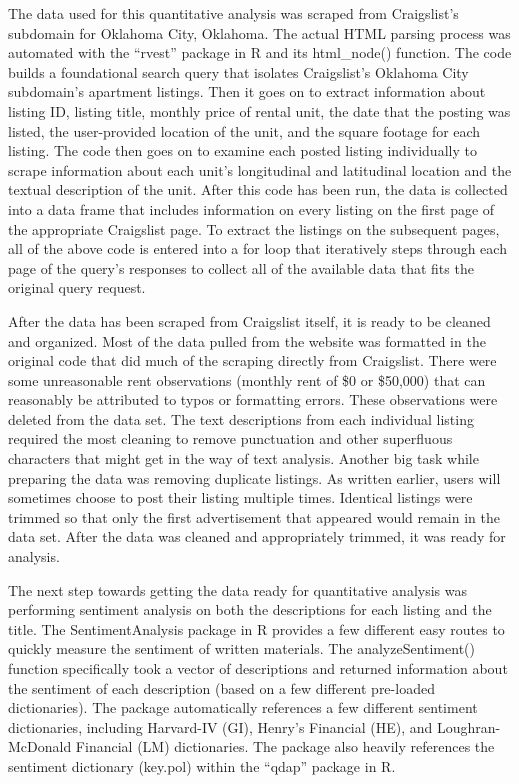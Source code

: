 \documentclass[12pt,english]{article}
\begin{document}
The data used for this quantitative analysis was scraped from Craigslist’s subdomain for Oklahoma City, Oklahoma. The actual HTML parsing process was automated with the “rvest” package in R and its html\_node() function. The code builds a foundational search query that isolates Craigslist’s Oklahoma City subdomain’s apartment listings. Then it goes on to extract information about listing ID, listing title, monthly price of rental unit, the date that the posting was listed, the user-provided location of the unit, and the square footage for each listing. The code then goes on to examine each posted listing individually to scrape information about each unit’s longitudinal and latitudinal location and the textual description of the unit. After this code has been run, the data is collected into a data frame that includes information on every listing on the first page of the appropriate Craigslist page. To extract the listings on the subsequent pages, all of the above code is entered into a for loop that iteratively steps through each page of the query’s responses to collect all of the available data that fits the original query request. 

After the data has been scraped from Craigslist itself, it is ready to be cleaned and organized. Most of the data pulled from the website was formatted in the original code that did much of the scraping directly from Craigslist. There were some unreasonable rent observations (monthly rent of \$0 or \$50,000) that can reasonably be attributed to typos or formatting errors. These observations were deleted from the data set. The text descriptions from each individual listing required the most cleaning to remove punctuation and other superfluous characters that might get in the way of text analysis. Another big task while preparing the data was removing duplicate listings. As written earlier, users will sometimes choose to post their listing multiple times. Identical listings were trimmed so that only the first advertisement that appeared would remain in the data set. After the data was cleaned and appropriately trimmed, it was ready for analysis. 

The next step towards getting the data ready for quantitative analysis was performing sentiment analysis on both the descriptions for each listing and the title. The SentimentAnalysis package in R provides a few different easy routes to quickly measure the sentiment of written materials. The analyzeSentiment() function specifically took a vector of descriptions and returned information about the sentiment of each description (based on a few different pre-loaded dictionaries). The package automatically references a few different sentiment dictionaries, including Harvard-IV (GI), Henry’s Financial (HE), and Loughran-McDonald Financial (LM) dictionaries. The package also heavily references the sentiment dictionary (key.pol) within the “qdap” package in R. 
\end{document}

